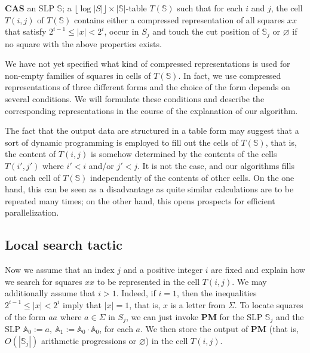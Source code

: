 \documentclass[11pt]{article}
\theoremstyle{break}
\newcommand{\slp}[1]{\mathbb{#1}}
\newcommand{\problem}[3]{\smallskip
            \noindent {\sc Problem:} \textbf{#1} \newline
            \noindent {\sc Input:} #2 \newline
            \noindent {\sc Output:} #3
\smallskip}
\begin{document}
\problem{CAS}{an SLP $\slp{S}$;}{a $\lfloor\log|S|\rfloor\times |\slp{S}|$-table $T(\slp{S})$ such that for each $i$ and $j$, the cell
$T(i,j)$ of $T(\slp{S})$ contains either a compressed representation of all squares $xx$ that satisfy $2^{i-1}\le|x|<2^i$, occur in $S_j$
and touch the cut position of $\slp{S}_j$ or $\varnothing$ if no square with the above properties exists.}

We have not yet specified what kind of compressed representations is used for non-empty families of squares in cells of $T(\slp{S})$. In
fact, we use compressed representations of three different forms and the choice of the form depends on several conditions. We will
formulate these conditions and describe the corresponding representations in the course of the explanation of our algorithm.

The fact that the output data are structured in a table form may suggest that a sort of dynamic programming is employed to fill out the
cells of $T(\slp{S})$, that is, the content of $T(i,j)$ is somehow determined by the contents of the cells $T(i',j')$ where $i'<i$ and/or
$j'<j$. It is not the case, and our algorithms fills out each cell of $T(\slp{S})$ independently of the contents of other cells. On the one
hand, this can be seen as a disadvantage as quite similar calculations are to be repeated many times; on the other hand, this opens
prospects for efficient parallelization.

\subsection{Local search tactic}

Now we assume that an index $j$ and a positive integer $i$ are fixed and explain how we search for squares $xx$ to be represented in the
cell $T(i,j)$. We may additionally assume that $i>1$. Indeed, if $i=1$, then the inequalities $2^{i-1}\le|x|<2^i$ imply that $|x|=1$, that
is, $x$ is a letter from $\Sigma$. To locate squares of the form $aa$ where $a\in\Sigma$ in $S_j$, we can just invoke \textbf{PM} for the
SLP $\slp{S}_j$ and the SLP $\slp{A}_0:=a,\ \slp{A}_1:=\slp{A}_0\cdot\slp{A}_0$, for each $a$. We then store the output of \textbf{PM}
(that is, $O(|\slp{S}_j|)$ arithmetic progressions or $\varnothing$) in the cell $T(i,j)$.
\end{document}
